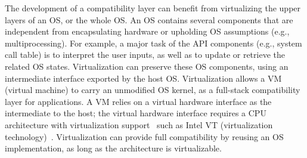 %



The development of a compatibility layer
can benefit from virtualizing the upper layers of an OS, or the whole OS.
An OS contains
several components that are independent from
encapsulating hardware or upholding OS assumptions (e.g., multiprocessing).
For example, a major task of the API components
(e.g., system call table)
is to interpret the user inputs,
as well as to update or retrieve the related OS states.
Virtualization can preserve these OS components,
using an intermediate interface
exported by the host OS.
Virtualization allows a VM (virtual machine) to carry an unmodified OS kernel,
as a full-stack compatibility layer
for applications.
A VM relies on a virtual hardware interface as the intermediate
to the host;
the virtual hardware interface requires a CPU architecture with virtualization support~\cite{popek74virtual}
such as Intel VT (virtualization technology)~\cite{VT}.
Virtualization can provide full compatibility
by reusing an OS implementation,
as long as the architecture is virtualizable.





